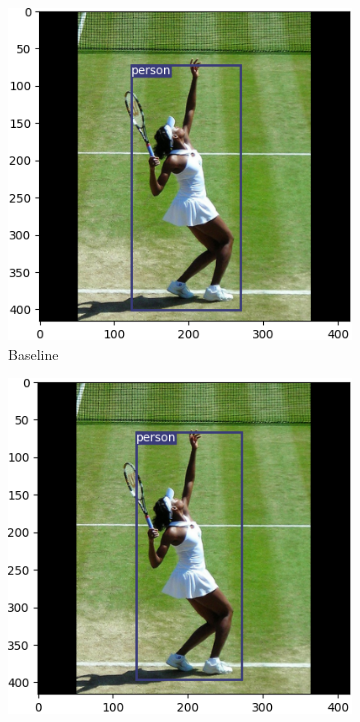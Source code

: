 \begin{figure}[!htbp]
\begin{subfigure}{.2\textwidth}
  \includegraphics[width=\textwidth]{images/base_tennis.png}
  \caption{Baseline}
  \label{fig:basetennis}
\end{subfigure}%
\begin{subfigure}{.2\textwidth}
  \centering
  \includegraphics[width=\textwidth]{images/CBAM_tennis.png}

\end{subfigure}
\end{figure}
